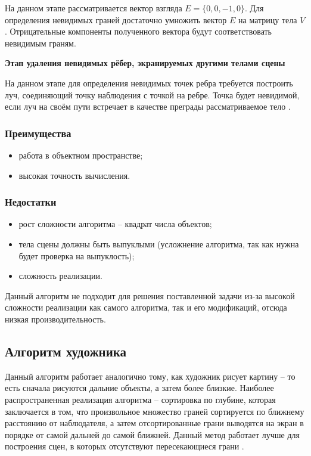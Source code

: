На данном этапе рассматривается вектор взгляда $E=\{0, 0,-1, 0\}$.
Для определения невидимых граней достаточно умножить вектор $E$ на матрицу тела $V$. Отрицательные компоненты полученного вектора будут соответствовать невидимым граням.

\textbf{Этап удаления невидимых рёбер, экранируемых другими телами сцены}

На данном этапе для определения невидимых точек ребра требуется построить луч, соединяющий точку наблюдения с точкой на ребре. Точка будет невидимой, если луч на своём пути встречает в качестве преграды рассматриваемое тело \cite{roberts}.

\subsubsection*{Преимущества}
\begin{itemize}
	\item работа в объектном пространстве;
	\item высокая точность вычисления.
\end{itemize}

\subsubsection*{Недостатки}
\begin{itemize}
	\item рост сложности алгоритма – квадрат числа объектов;
	\item тела сцены должны быть выпуклыми (усложнение алгоритма, так как нужна будет проверка на выпуклость);
	\item сложность реализации.
\end{itemize}

Данный алгоритм не подходит для решения поставленной задачи из-за высокой сложности реализации как самого алгоритма, так и его модификаций, отсюда низкая производительность.


\subsection{Алгоритм художника}
Данный алгоритм работает аналогично тому, как художник рисует картину – то есть сначала рисуются дальние объекты, а затем более близкие. Наиболее распространенная реализация алгоритма – сортировка по глубине, которая заключается в том, что произвольное множество граней сортируется по ближнему расстоянию от наблюдателя, а затем отсортированные грани выводятся на экран в порядке от самой дальней до самой ближней. Данный метод работает лучше для построения сцен, в которых отсутствуют пересекающиеся грани \cite{hudognik}. 

